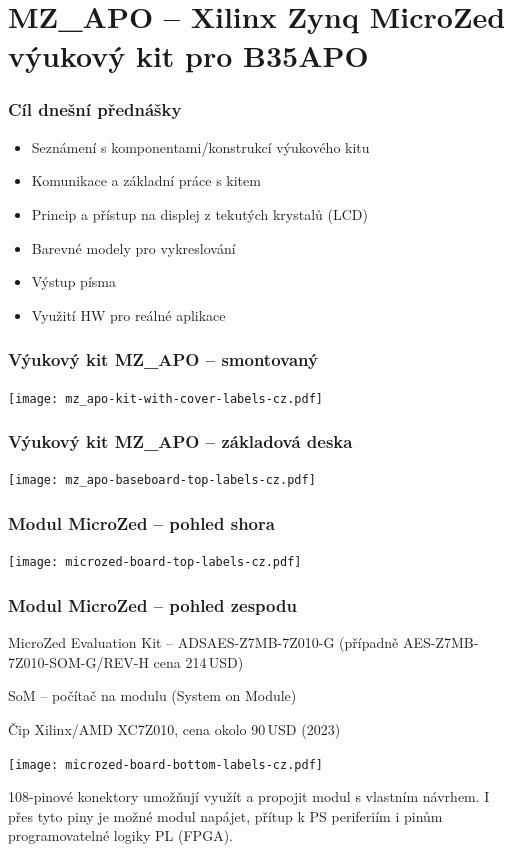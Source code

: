 \documentclass{beamer}
\subtitle{Lekce 08. Výukový kit MZ\_APO (Xilinx Zynq MicroZed APO)}
\author{Pavel Píša \phantom{xxxxxxxxx} Petr Štěpán \\ \small\texttt{pisa@fel.cvut.cz}\phantom{xxxx}\small\texttt{stepan@fel.cvut.cz}}
\begin{document}
\maketitle

\section{MZ\_APO -- Xilinx Zynq MicroZed výukový kit pro B35APO}

\begin{frame}
\frametitle{Cíl dnešní přednášky}

\begin{itemize}
 \item Seznámení s komponentami/konstrukcí výukového kitu
 \item Komunikace a základní práce s kitem
 \item Princip a přístup na displej z tekutých krystalů (LCD)
 \item Barevné modely pro vykreslování
 \item Výstup písma
 \item Využití HW pro reálné aplikace
\end{itemize}
\end{frame}

\begin{frame}
\frametitle{Výukový kit MZ\_APO -- smontovaný}

\texttt{[image: mz\_apo-kit-with-cover-labels-cz.pdf]}

\end{frame}

\begin{frame}
\frametitle{Výukový kit MZ\_APO -- základová deska}

\texttt{[image: mz\_apo-baseboard-top-labels-cz.pdf]}

\end{frame}

\begin{frame}
\frametitle{Modul MicroZed -- pohled shora}

\texttt{[image: microzed-board-top-labels-cz.pdf]}

\end{frame}

\begin{frame}
\frametitle{Modul MicroZed -- pohled zespodu}

MicroZed Evaluation Kit -- ADSAES-Z7MB-7Z010-G (případně AES-Z7MB-7Z010-SOM-G/REV-H cena 214\,USD)
\par
SoM -- počítač na modulu (System on Module)
\par
Čip Xilinx/AMD XC7Z010, cena okolo 90\,USD (2023)
\par
\texttt{[image: microzed-board-bottom-labels-cz.pdf]}
\par
108-pinové konektory umožňují využít a propojit modul s vlastním návrhem. I přes tyto piny je možné modul napájet,
přítup k PS periferiím i pinům programovatelné logiky PL (FPGA).

\end{frame}
\end{document}
